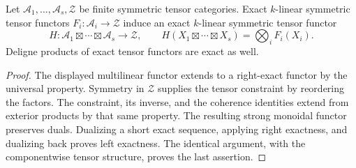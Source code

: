 \begin{lemma}\label{lem:combine-functors}
Let $\mathcal A_1,\ldots,\mathcal A_s,\mathcal Z$ be finite symmetric
tensor categories. Exact $k$-linear symmetric tensor functors
$F_i:\mathcal A_i\to\mathcal Z$ induce an exact $k$-linear symmetric
tensor functor
\[
 H:\mathcal A_1\boxtimes\cdots\boxtimes\mathcal A_s\to\mathcal Z,
 \qquad H(X_1\boxtimes\cdots\boxtimes X_s)=\bigotimes_i F_i(X_i).
\]
Deligne products of exact tensor functors are exact as well.
\end{lemma}

\begin{proof}
The displayed multilinear functor extends to a right-exact functor by
the universal property. Symmetry in $\mathcal Z$ supplies the tensor
constraint by reordering the factors. The constraint, its inverse,
and the coherence identities extend from exterior products by that
same property. The resulting strong monoidal functor preserves duals.
Dualizing a short exact sequence, applying right exactness, and
dualizing back proves left exactness. The identical argument, with
the componentwise tensor structure, proves the last assertion.
\end{proof}

